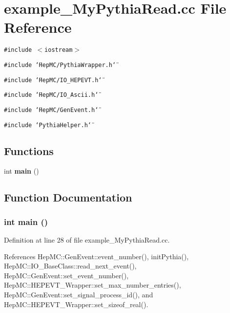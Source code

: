 \section{example\_\-My\-Pythia\-Read.cc File Reference}
\label{example__MyPythiaRead_8cc}
{\tt \#include $<$iostream$>$}\par
{\tt \#include \char`\"{}Hep\-MC/Pythia\-Wrapper.h\char`\"{}}\par
{\tt \#include \char`\"{}Hep\-MC/IO\_\-HEPEVT.h\char`\"{}}\par
{\tt \#include \char`\"{}Hep\-MC/IO\_\-Ascii.h\char`\"{}}\par
{\tt \#include \char`\"{}Hep\-MC/Gen\-Event.h\char`\"{}}\par
{\tt \#include \char`\"{}Pythia\-Helper.h\char`\"{}}\par
\subsection*{Functions}
\begin{CompactItemize}
\item 
int {\bf main} ()
\end{CompactItemize}


\subsection{Function Documentation}
\subsubsection{\setlength{\rightskip}{0pt plus 5cm}int main ()}\label{example__MyPythiaRead_8cc_e66f6b31b5ad750f1fe042a706a4e3d4}




Definition at line 28 of file example\_\-My\-Pythia\-Read.cc.

References Hep\-MC::Gen\-Event::event\_\-number(), init\-Pythia(), Hep\-MC::IO\_\-Base\-Class::read\_\-next\_\-event(), Hep\-MC::Gen\-Event::set\_\-event\_\-number(), Hep\-MC::HEPEVT\_\-Wrapper::set\_\-max\_\-number\_\-entries(), Hep\-MC::Gen\-Event::set\_\-signal\_\-process\_\-id(), and Hep\-MC::HEPEVT\_\-Wrapper::set\_\-sizeof\_\-real().